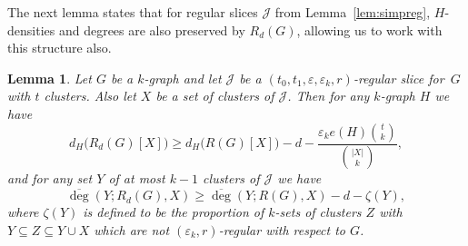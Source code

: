 \documentclass[12pt,a4paper]{amsart}
\let\eps\varepsilon
\newtheorem{lemma}[theorem] {Lemma}
\newcommand{\cJ}{\mathcal{J}}
\newcommand{\reldeg}{\overline{\deg}}
\begin{document}
The next lemma states
that for regular slices $\cJ$ from Lemma~\ref{lem:simpreg}, $H$-densities and degrees are also preserved by $R_d(G)$, allowing us to work with this
structure also.

\begin{lemma} \label{reducedd+d} 
Let $G$ be a $k$-graph and let $\cJ$ be a
$(t_0,t_1,\eps,\eps_k,r)$-regular slice for~$G$ with $t$
clusters. Also let $X$ be a set of clusters of $\cJ$. Then for any $k$-graph $H$ we have
\begin{equation*} \label{eq:reduceddensity} 
d_H\big(R_d(G)[X]\big)\ge d_H\big(R(G)[X]\big) - d - \frac{\eps_k e(H)
\binom{t}{k}}{\binom{|X|}{k}},
\end{equation*} 
and for any set $Y$ of at most $k-1$ clusters of $\cJ$ we have
\begin{equation*} \label{eq:reduceddegree} 
\reldeg(Y;R_{d}(G), X) \ge \reldeg(Y;R(G), X) - d - \zeta(Y),
\end{equation*}
where $\zeta(Y)$ is defined to be the proportion of $k$-sets of clusters $Z$
with $Y \subseteq Z \subseteq Y \cup X$ which are not $(\eps_k, r)$-regular with respect to $G$.
\end{lemma}
\end{document}
